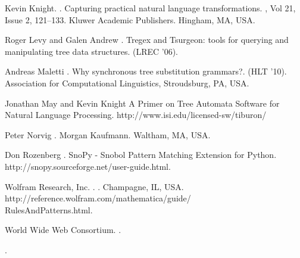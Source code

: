 \documentclass[a4,11pt]{article}
\begin{document}
\begin{thebibliography}{}
Kevin Knight.
.
\newblock Capturing practical natural language transformations.
, Vol 21, Issue 2, 121--133.
\newblock Kluwer Academic Publishers.
\newblock Hingham, MA, USA.


Roger Levy and Galen Andrew
.
\newblock Tregex and Tsurgeon: tools for querying and manipulating tree data structures.
 (LREC '06).

Andreas Maletti
. 
\newblock Why synchronous tree substitution grammars?.
  (HLT '10).
\newblock Association for Computational Linguistics, Stroudsburg, PA, USA.

Jonathan May and Kevin Knight
\newblock A Primer on Tree Automata Software for Natural Language Processing.
\newblock http://www.isi.edu/licensed-sw/tiburon/


Peter Norvig
.
\newblock Morgan Kaufmann.
\newblock Waltham, MA, USA.


Don Rozenberg
.
\newblock SnoPy - Snobol Pattern Matching Extension for Python.
\newblock http://snopy.sourceforge.net/user-guide.html.


Wolfram Research, Inc.
.
.
\newblock Champagne, IL, USA.
\newblock http://reference.wolfram.com/mathematica/guide/\\RulesAndPatterns.html.

World Wide Web Consortium.
.

.


\end{thebibliography}
\end{document}
